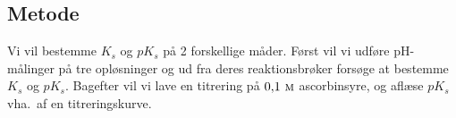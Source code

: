 \subsection*{Metode}
Vi vil bestemme $K_s$ og $pK_s$ på 2 forskellige måder.
Først vil vi udføre pH-målinger på tre opløsninger og
ud fra deres reaktionsbrøker forsøge at bestemme $K_s$ og $pK_s$.
Bagefter vil vi lave en titrering på $0{,}1\ \textsc{m}$ ascorbinsyre,
og aflæse $pK_s$ vha.~af en titreringskurve.